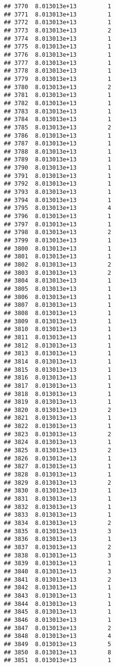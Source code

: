 \documentclass[
]{article}
\begin{document}
\begin{verbatim}
## 3770  8.013013e+13         1
## 3771  8.013013e+13         1
## 3772  8.013013e+13         1
## 3773  8.013013e+13         2
## 3774  8.013013e+13         1
## 3775  8.013013e+13         1
## 3776  8.013013e+13         1
## 3777  8.013013e+13         1
## 3778  8.013013e+13         1
## 3779  8.013013e+13         1
## 3780  8.013013e+13         2
## 3781  8.013013e+13         1
## 3782  8.013013e+13         1
## 3783  8.013013e+13         1
## 3784  8.013013e+13         1
## 3785  8.013013e+13         2
## 3786  8.013013e+13         1
## 3787  8.013013e+13         1
## 3788  8.013013e+13         1
## 3789  8.013013e+13         1
## 3790  8.013013e+13         1
## 3791  8.013013e+13         1
## 3792  8.013013e+13         1
## 3793  8.013013e+13         1
## 3794  8.013013e+13         1
## 3795  8.013013e+13         4
## 3796  8.013013e+13         1
## 3797  8.013013e+13         1
## 3798  8.013013e+13         2
## 3799  8.013013e+13         1
## 3800  8.013013e+13         1
## 3801  8.013013e+13         1
## 3802  8.013013e+13         2
## 3803  8.013013e+13         2
## 3804  8.013013e+13         1
## 3805  8.013013e+13         1
## 3806  8.013013e+13         1
## 3807  8.013013e+13         1
## 3808  8.013013e+13         1
## 3809  8.013013e+13         1
## 3810  8.013013e+13         1
## 3811  8.013013e+13         1
## 3812  8.013013e+13         1
## 3813  8.013013e+13         1
## 3814  8.013013e+13         1
## 3815  8.013013e+13         1
## 3816  8.013013e+13         1
## 3817  8.013013e+13         1
## 3818  8.013013e+13         1
## 3819  8.013013e+13         1
## 3820  8.013013e+13         2
## 3821  8.013013e+13         1
## 3822  8.013013e+13         1
## 3823  8.013013e+13         2
## 3824  8.013013e+13         1
## 3825  8.013013e+13         2
## 3826  8.013013e+13         1
## 3827  8.013013e+13         1
## 3828  8.013013e+13         1
## 3829  8.013013e+13         2
## 3830  8.013013e+13         1
## 3831  8.013013e+13         1
## 3832  8.013013e+13         1
## 3833  8.013013e+13         1
## 3834  8.013013e+13         2
## 3835  8.013013e+13         3
## 3836  8.013013e+13         1
## 3837  8.013013e+13         2
## 3838  8.013013e+13         3
## 3839  8.013013e+13         1
## 3840  8.013013e+13         3
## 3841  8.013013e+13         2
## 3842  8.013013e+13         1
## 3843  8.013013e+13         1
## 3844  8.013013e+13         1
## 3845  8.013013e+13         1
## 3846  8.013013e+13         1
## 3847  8.013013e+13         2
## 3848  8.013013e+13         4
## 3849  8.013013e+13         5
## 3850  8.013013e+13         8
## 3851  8.013013e+13         1

\end{verbatim}
\end{document}
